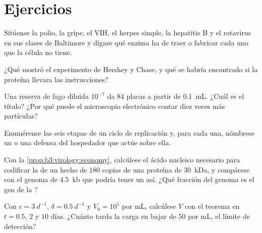 \section{Ejercicios}

\begin{exercise}[$\star$]\label{exo:b3:virology:1}
Sitúense la polio, la gripe, el VIH, el herpes simple, la hepatitis B y
el rotavirus en sus clases de Baltimore y dígase qué enzima ha de traer o
fabricar cada uno que la célula no tiene.
\end{exercise}

\begin{exercise}[$\star$]\label{exo:b3:virology:2}
¿Qué mostró el experimento de Hershey y Chase, y qué se habría encontrado
si la proteína llevara las instrucciones?
\end{exercise}

\begin{exercise}[$\star$]\label{exo:b3:virology:3}
Una reserva de fago diluida $10^{-7}$ da $84$ placas a partir de
\qty{0.1}{mL}. ¿Cuál es el título? ¿Por qué puede el microscopio
electrónico contar diez veces más partículas?
\end{exercise}

\begin{exercise}[$\star$]\label{exo:b3:virology:4}
Enumérense las seis etapas de un ciclo de replicación y, para cada una,
nómbrese un  o una defensa del hospedador que actúe sobre ella.
\end{exercise}

\begin{exercise}[$\star\star$]\label{exo:b3:virology:5}
Con la \cref{prop:b3:virology:economy}, calcúlese el ácido nucleico
necesario para codificar la  de un  hecho de $180$ copias de
una proteína de \qty{30}{kDa}, y compárese con el genoma de \qty{4.5}{kb}
que podría tener un  así. ¿Qué fracción del genoma es el gen de la
?
\end{exercise}

\begin{exercise}[$\star\star$]\label{exo:b3:virology:6}
Con $c = \qty{3}{d^{-1}}$, $\delta = \qty{0.5}{d^{-1}}$ y $V_{0} =
10^{5}$ por mL, calcúlese $V$ con el teorema en $t = 0.5$, $2$ y $10$
días. ¿Cuánto tarda la carga en bajar de $50$ por mL, el límite de
detección?
\end{exercise}

